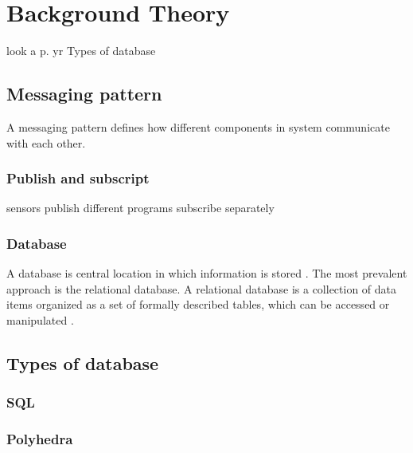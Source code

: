 \section{Background Theory}

look a p. yr
Types of database

\subsection{Messaging pattern}
A messaging pattern defines how different components in system communicate with each other.

	\subsubsection{Publish and subscript}
	sensors publish
    different programs subscribe separately
    
    \subsubsection{Database}
    A database is central location in which information is stored \cite{databasedefinition}. The most prevalent approach is the relational database. A relational database is a collection of data items organized as a set of formally described tables, which can be accessed or manipulated \cite{relationaldatabasedefinition}.

\subsection{Types of database}

  \subsubsection{SQL}

  \subsubsection{Polyhedra}
